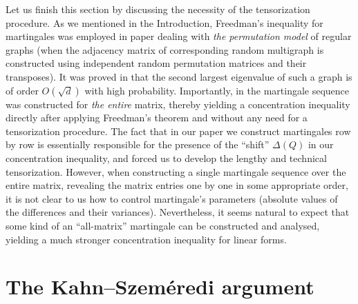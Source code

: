 \documentclass[12pt]{article}
\theoremstyle{definition}
\theoremstyle{plain}
\begin{document}
Let us finish this section by discussing the necessity of the tensorization procedure.
As we mentioned in the Introduction,
Freedman's inequality for martingales was employed in paper \cite{DJPP} dealing with {\it the permutation
model} of regular graphs (when the adjacency matrix of corresponding random multigraph is constructed
using independent random permutation matrices and their transposes).
It was proved in \cite{DJPP} that the second largest eigenvalue of such a graph is of order $O(\sqrt{d})$
with high probability.
Importantly, in \cite{DJPP} the martingale sequence was constructed for {\it the entire} matrix,
thereby yielding a concentration inequality directly after applying Freedman's theorem and
without any need for a tensorization procedure.
The fact that in our paper we construct martingales row by row is essentially responsible for the 
presence of the ``shift'' $\Delta(Q)$ in our concentration inequality, and
forced us to develop the lengthy and technical tensorization.
However, when constructing a single martingale sequence over the entire matrix, revealing the matrix entries
one by one in some appropriate order,
it is not clear to us how to control
martingale's parameters (absolute values of the differences and their variances).
Nevertheless, it seems natural to expect that some kind of an ``all-matrix'' martingale
can be constructed and analysed, yielding a much stronger concentration inequality for linear forms.







\section{The Kahn--Szem\'eredi argument}\label{s: kahn-szemeredi}
\end{document}
